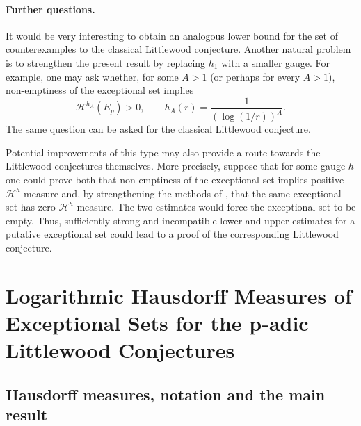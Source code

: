 \documentclass[11pt]{article}
\theoremstyle{remark}
\newcommand{\Haus}{\mathcal{H}}
\begin{document}
\paragraph{Further questions.}
It would be very interesting to obtain an analogous lower bound for the set
of counterexamples to the classical Littlewood conjecture.  Another natural
problem is to strengthen the present result by replacing $h_1$ with a smaller
gauge.  For example, one may ask whether, for some $A>1$ (or perhaps for every
$A>1$), non-emptiness of the exceptional set implies
\begin{equation} \label{eq:future-gauge}
    \Haus^{h_A}(E_p)>0,
    \qquad
    h_A(r)=\frac{1}{(\log(1/r))^A}.
\end{equation}
The same question can be asked for the classical Littlewood conjecture.

Potential improvements of this type may also provide a route towards
the Littlewood conjectures themselves.  More precisely, suppose that
for some gauge $h$ one could prove both that non-emptiness of the
exceptional set implies positive $\Haus^h$-measure and, by
strengthening the methods of
\cite{EinsiedlerKatokLindenstrauss2006,EinsiedlerKleinbock2007},
that the same exceptional set has zero $\Haus^h$-measure.  The two
estimates would force the exceptional set to be empty.  Thus,
sufficiently strong and incompatible lower and upper estimates for a
putative exceptional set could lead to a proof of the corresponding
Littlewood conjecture.

\section{Logarithmic Hausdorff Measures of Exceptional Sets for the p-adic Littlewood Conjectures}
\subsection{Hausdorff measures, notation and the main result}
\end{document}
